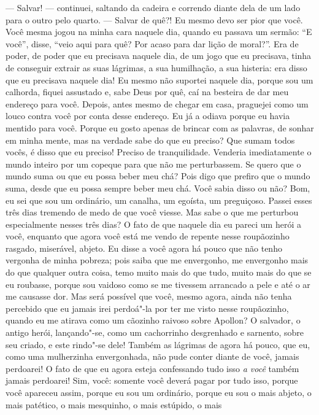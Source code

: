 --- Salvar! --- continuei, saltando da cadeira e correndo diante dela de um
lado para o outro pelo quarto. --- Salvar de quê?! Eu mesmo devo ser pior
que você. Você mesma jogou na minha cara naquele dia, quando eu passava
um sermão: ``E você'', disse, ``veio aqui para quê? Por acaso para dar
lição de moral?''. Era de poder, de poder que eu precisava naquele dia,
de um jogo que eu precisava, tinha de conseguir extrair as suas
lágrimas, a sua humilhação, a sua histeria: era disso que eu precisava
naquele dia! Eu mesmo não suportei naquele dia, porque sou um calhorda,
fiquei assustado e, sabe Deus por quê, caí na besteira de dar meu endereço
para você. Depois, antes mesmo de chegar em casa, praguejei como um
louco contra você por conta desse endereço. Eu já a odiava porque eu
havia mentido para você. Porque eu gosto apenas de brincar com as
palavras, de sonhar em minha mente, mas na verdade sabe do que eu
preciso? Que sumam todos vocês, é disso que eu preciso! Preciso de
tranquilidade. Venderia imediatamente o mundo inteiro por um copeque
para que não me perturbassem. Se quero que o mundo suma ou que eu
possa beber meu chá? Pois digo que prefiro que o mundo suma, desde
que eu possa sempre beber meu chá. Você sabia disso ou não? Bom, eu sei
que sou um ordinário, um canalha, um egoísta, um preguiçoso. Passei
esses três dias tremendo de medo de que você viesse. Mas sabe o que me
perturbou especialmente nesses três dias? O fato de que naquele dia eu
pareci um herói a você, enquanto que agora você está me vendo de
repente nesse roupãozinho rasgado, miserável, abjeto. Eu disse a você
agora há pouco que não tenho vergonha de minha pobreza; pois saiba que
me envergonho, me envergonho mais do que qualquer outra coisa, temo
muito mais do que tudo, muito mais do que se eu roubasse, porque sou
vaidoso como se me tivessem arrancado a pele e até o ar me causasse
dor. Mas será possível que você, mesmo agora, ainda não tenha percebido
que eu jamais irei perdoá"-la por ter me visto nesse roupãozinho, quando
eu me atirava como um cãozinho raivoso sobre Apollon? O salvador, o
antigo herói, lançando"-se, como um cachorrinho desgrenhado e sarnento,
sobre seu criado, e este rindo"-se dele! Também as lágrimas de agora há
pouco, que eu, como uma mulherzinha envergonhada, não pude conter
diante de você, jamais perdoarei! O fato de que eu agora esteja
confessando tudo isso \textit{a você} também jamais
perdoarei! Sim, você: somente você deverá pagar por tudo isso, porque
você apareceu assim, porque eu sou um ordinário, porque eu sou o mais
abjeto, o mais patético, o mais mesquinho, o mais estúpido, o mais
